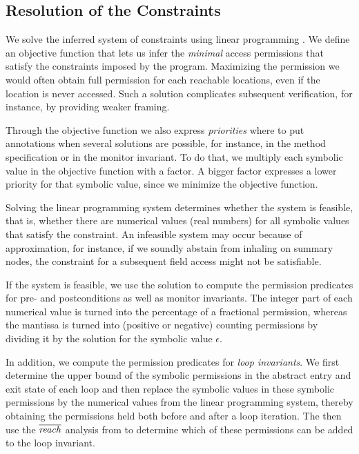 \documentclass{llncs}
\begin{document}
\goup
\subsection{Resolution of the Constraints}
\goup

We solve the inferred system of constraints using linear programming
\cite{DAN63}. We define an objective function that lets us infer the
\emph{minimal} access permissions that satisfy the constraints imposed
by the program. Maximizing the permission we would often obtain full
permission for each reachable locations, even if the location is never
accessed. Such a solution complicates subsequent verification, for
instance, by providing weaker framing.

Through the objective function we also express \emph{priorities} where
to put annotations when several solutions are possible, for instance,
in the method specification or in the monitor invariant. To do that,
we multiply each symbolic value in the objective function with a
factor. A bigger factor expresses a lower priority for that symbolic
value, since we minimize the objective function.

Solving the linear programming system determines whether the
system is feasible, that is, whether there are numerical values (real
numbers) for all symbolic values that satisfy the constraint.  An
infeasible system may occur because of approximation, for instance, if
we soundly abstain from inhaling on summary nodes, the constraint for
a subsequent field access might not be satisfiable.

If the system is feasible, we use the solution to compute the
permission predicates for pre- and postconditions as well as monitor
invariants. The integer part of each numerical value is turned into
the percentage of a fractional permission, whereas the mantissa is
turned into (positive or negative) counting permissions by dividing it
by the solution for the symbolic value $\epsilon$.

In addition, we compute the permission predicates for \emph{loop
  invariants}. We first determine the upper bound of the symbolic
permissions in the abstract entry and exit state of each loop and then
replace the symbolic values in these symbolic permissions by the
numerical values from the linear programming system, thereby obtaining
the permissions held both before and after a loop iteration. The then
use the $\overline{\mathit{reach}}$ analysis from
 to determine which of these permissions
can be added to the loop invariant.
\end{document}
